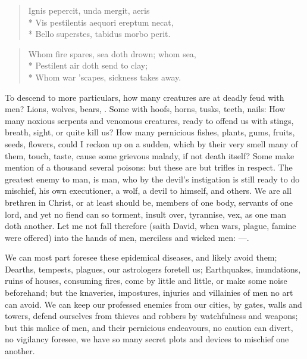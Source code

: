 {\begin{verse}
\textlatin{Ignis pepercit, unda mergit, aeris}\\*
\textlatin{Vis pestilentis aequori ereptum necat,}\\*
\textlatin{Bello superstes, tabidus morbo perit.}
\end{verse}

\begin{verse}
Whom fire spares, sea doth drown; whom sea,\\*
Pestilent air doth send to clay;\\*
Whom war 'scapes, sickness takes away.
\end{verse}

To descend to more particulars, how many creatures are at deadly feud
with men? Lions, wolves, bears, \etc{}. Some with hoofs, horns, tusks,
teeth, nails: How many noxious serpents and venomous creatures, ready
to offend us with stings, breath, sight, or quite kill us? How many
pernicious fishes, plants, gums, fruits, seeds, flowers, \etc{} could I
reckon up on a sudden, which by their very smell many of them, touch,
taste, cause some grievous malady, if not death itself? Some make
mention of a thousand several poisons: but these are but trifles in
respect. The greatest enemy to man, is man, who by the devil's
instigation is still ready to do mischief, his own executioner, a wolf,
a devil to himself, and others. We are all brethren in Christ, or
at least should be, members of one body, servants of one lord, and yet
no fiend can so torment, insult over, tyrannise, vex, as one man doth
another. Let me not fall therefore (saith David, when wars, plague,
famine were offered) into the hands of men, merciless and wicked men:
---.

We can most part foresee these epidemical diseases, and likely avoid
them; Dearths, tempests, plagues, our astrologers foretell us;
Earthquakes, inundations, ruins of houses, consuming fires, come by
little and little, or make some noise beforehand; but the knaveries,
impostures, injuries and villainies of men no art can avoid. We can
keep our professed enemies from our cities, by gates, walls and towers,
defend ourselves from thieves and robbers by watchfulness and weapons;
but this malice of men, and their pernicious endeavours, no caution can
divert, no vigilancy foresee, we have so many secret plots and devices
to mischief one another.

}
